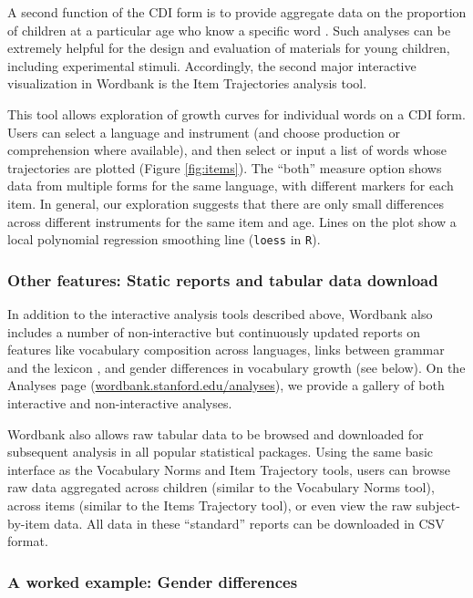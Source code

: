 \documentclass[man,noapacite]{apa}
\begin{document}
A second function of the CDI form is to provide aggregate data on the proportion of children at a particular age who know a specific word \cite{dale1996,jorgensen2010}. Such analyses can be extremely helpful for the design and evaluation of materials for young children, including experimental stimuli. Accordingly, the second major interactive visualization in Wordbank is the Item Trajectories analysis tool. 

This tool allows exploration of growth curves for individual words on a CDI form. Users can select a language and instrument (and choose production or comprehension where available), and then select or input a list of words whose trajectories are plotted (Figure \ref{fig:items}). The ``both'' measure option shows data from multiple forms for the same language, with different markers for each item. In general, our exploration suggests that there are only small differences across different instruments for the same item and age. Lines on the plot show a local polynomial regression smoothing line (\texttt{loess} in \texttt{R}). 

\subsubsection{Other features: Static reports and tabular data download}

In addition to the interactive analysis tools described above, Wordbank also includes a number of non-interactive but continuously updated reports on features like vocabulary composition across languages, links between grammar and the lexicon \cite{braginsky2015}, and gender differences in vocabulary growth (see below). On the Analyses page (\url{wordbank.stanford.edu/analyses}), we provide a gallery of both interactive and non-interactive analyses. 

Wordbank also allows raw tabular data to be browsed and downloaded for subsequent analysis in all popular statistical packages. Using the same basic interface as the Vocabulary Norms and Item Trajectory tools, users can browse raw data aggregated across children (similar to the Vocabulary Norms tool), across items (similar to the Items Trajectory tool), or even view the raw subject-by-item data. All data in these ``standard'' reports can be downloaded in CSV format. 

\subsubsection{A worked example: Gender differences}
\end{document}
